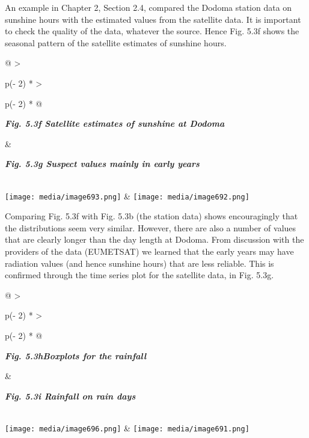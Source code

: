 \documentclass[
  letterpaper,
  DIV=11,
  numbers=noendperiod]{scrreprt}
\begin{document}
An example in Chapter 2, Section 2.4, compared the Dodoma station data
on sunshine hours with the estimated values from the satellite data. It
is important to check the quality of the data, whatever the source.
Hence Fig. 5.3f shows the seasonal pattern of the satellite estimates of
sunshine hours.

\begin{longtable}[]{@{}
  >{\raggedright\arraybackslash}p{(\columnwidth - 2\tabcolsep) * }
  >{\raggedright\arraybackslash}p{(\columnwidth - 2\tabcolsep) * }@{}}
\toprule\noalign{}
\begin{minipage}[b]{\linewidth}\raggedright
\textbf{\emph{Fig. 5.3f Satellite estimates of sunshine at Dodoma}}
\end{minipage} & \begin{minipage}[b]{\linewidth}\raggedright
\textbf{\emph{Fig. 5.3g Suspect values mainly in early years}}
\end{minipage} \\
\midrule\noalign{}
\endhead
\bottomrule\noalign{}
\endlastfoot
\texttt{[image: media/image693.png]} &
\texttt{[image: media/image692.png]} \\
\end{longtable}

Comparing Fig. 5.3f with Fig. 5.3b (the station data) shows
encouragingly that the distributions seem very similar. However, there
are also a number of values that are clearly longer than the day length
at Dodoma. From discussion with the providers of the data (EUMETSAT) we
learned that the early years may have radiation values (and hence
sunshine hours) that are less reliable. This is confirmed through the
time series plot for the satellite data, in Fig. 5.3g.

\begin{longtable}[]{@{}
  >{\raggedright\arraybackslash}p{(\columnwidth - 2\tabcolsep) * }
  >{\raggedright\arraybackslash}p{(\columnwidth - 2\tabcolsep) * }@{}}
\toprule\noalign{}
\begin{minipage}[b]{\linewidth}\raggedright
\textbf{\emph{Fig. 5.3hBoxplots for the rainfall}}
\end{minipage} & \begin{minipage}[b]{\linewidth}\raggedright
\textbf{\emph{Fig. 5.3i Rainfall on rain days}}
\end{minipage} \\
\midrule\noalign{}
\endhead
\bottomrule\noalign{}
\endlastfoot
\texttt{[image: media/image696.png]} &
\texttt{[image: media/image691.png]} \\
\end{longtable}
\end{document}
